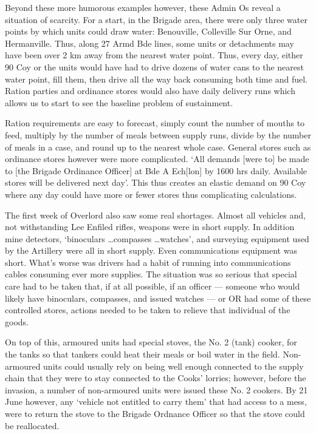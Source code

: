\documentclass[noraggedright]{turabian-researchpaper}
\begin{document}
Beyond these more humorous examples however, these Admin Os reveal a 
situation of scarcity.  For a start, in the Brigade area, there were only
three water points by which units could draw water:  Benouville, Colleville
Sur Orne, and Hermanville.  Thus, along 27 Armd Bde lines, some units or 
detachments may have been over 2 km away from the nearest water 
point.\autocite[June Adm Order No. 1][Para 4]{27wd}  Thus,
every day, either 90 Coy or the units would have had to drive dozens of water
cans to the nearest water point, fill them, then drive all the way back
consuming both time and fuel.  Ration parties and ordinance stores would also
have daily delivery runs which allows us to start to see the baseline problem
of sustainment.%

Ration requirements are easy to forecast, simply count the number of mouths to 
feed, multiply by the number of meals between supply runs, divide by the number
of meals in a case, and round up to the nearest whole case.  General stores 
such as ordinance stores however were more complicated.  `All demands [were to]
be made to [the Brigade Ordinance Officer] at Bde A Ech[lon] by 1600 hrs daily.
Available stores will be delivered next day'.\autocite[June Admin Order No. 1]
[Para 6a]{27wd}  This thus creates an elastic demand on 90 Coy where any day
could have more or fewer stores thus complicating calculations.  

The first week of Overlord also saw some real shortages.  Almost all vehicles
and, not withstanding Lee Enfiled rifles, weapons were in short supply.  In 
addition mine detectors, `binoculars \ldots compasses \ldots watches', and 
surveying equipment used by the Artillery were all in short supply.  Even
communications equipment was short.\autocite[Appendix A to 27 Armd Bde Adm 
Order No. 1 (June)]{27wd} What's worse was drivers had a habit of running
into communications cables consuming ever more supplies.\autocite[June Adm 
Order No. 2][Para 3]{27wd}  The situation was so serious that special care 
had to be taken that, if at all possible, if an officer --- someone who
would likely have binoculars, compasses, and issued watches --- or OR had
some of these controlled stores, actions needed to be taken to relieve that
individual of the goods.  

On top of this, armoured units had special stoves, the No. 2 (tank) cooker,
for the tanks so that tankers
could heat their meals or boil water in the field. Non-armoured units could 
usually rely on being well enough connected to the supply chain that they 
were to stay connected to the Cooks' lorries; however, before the invasion, a
number of non-armoured units were issued these No. 2 cookers.  By 21 June
however, any `vehicle not entitled to carry them' that had access to a mess,
were to return the stove to the Brigade Ordnance Officer so that the stove
could be reallocated.\autocite[June Adm Order No. 3][Para 3a]{27wd}
\end{document}
